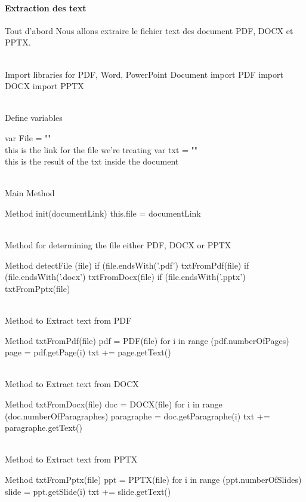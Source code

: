 \documentclass[12pt]{report}
\begin{document}
\paragraph{Extraction des text}
Tout d'abord Nous allons extraire le fichier text des document PDF, DOCX et PPTX. 
\begin{customFrame}
\\ Import libraries for PDF, Word, PowerPoint Document 
import PDF
import DOCX
import PPTX

\\ Define variables 

var File = "" \\ this is the link for the file we're treating
var txt = "" \\ this is the result of the txt inside the document

\\ Main Method

Method init(documentLink) {
	this.file = documentLink
}

\\ Method for determining the file either PDF, DOCX or PPTX

Method detectFile (file) {
	if (file.endsWith('.pdf') {
		txtFromPdf(file)
	} if (file.endsWith('.docx') {
		txtFromDocx(file)
	} if (file.endsWith('.pptx') {
		txtFromPptx(file)
	}
}

\\ Method to Extract text from PDF

Method txtFromPdf(file) {
	pdf = PDF(file)
	for i in range (pdf.numberOfPages) {
		page = pdf.getPage(i)
		txt += page.getText()	
	}
}

\\ Method to Extract text from DOCX

Method txtFromDocx(file) {
	doc = DOCX(file)
	for i in range (doc.numberOfParagraphes) {
		paragraphe = doc.getParagraphe(i)
		txt += paragraphe.getText()	
	}
}

\\ Method to Extract text from PPTX

Method txtFromPptx(file) {
	ppt = PPTX(file)
	for i in range (ppt.numberOfSlides) {
		slide = ppt.getSlide(i)
		txt += slide.getText()	
	}
}
\end{customFrame}
\end{document}
